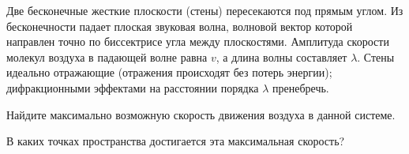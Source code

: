 
Две бесконечные жесткие плоскости (стены) пересекаются под прямым углом. Из бесконечности падает плоская звуковая волна, волновой вектор которой направлен точно по биссектрисе угла между плоскостями. Амплитуда скорости молекул воздуха в падающей волне равна $v$, а длина волны составляет $\lambda$. Стены идеально отражающие (отражения происходят без потерь энергии); дифракционными эффектами на расстоянии порядка $\lambda$ пренебречь.

\begin{task}[type=subproblem]
    \item Найдите максимально возможную скорость движения воздуха в данной системе.
    \item В каких точках пространства достигается эта максимальная скорость?
\end{task}
